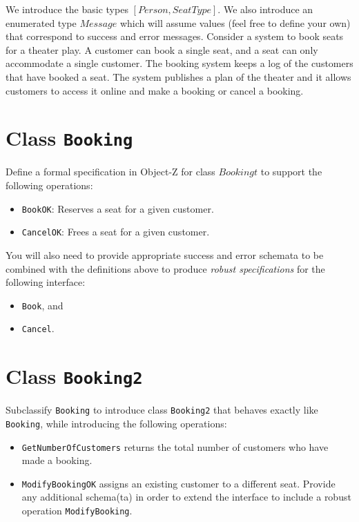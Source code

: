 \documentclass[12pt]{article}
\begin{document}
We introduce the basic types $[Person, SeatType]$. We also introduce an enumerated type $Message$ which will assume values (feel free to define your own) that correspond to success and error messages. Consider a system to book seats for a theater play. A customer can book a single seat, and a seat can only accommodate a single customer. The booking system keeps a log of the customers that have booked a seat. The system publishes a plan of the theater and it allows customers to access it online and make a booking or cancel a booking.\\

\section*{Class \texttt{Booking}}

Define a formal specification in Object-Z for class $Bookingt$ to  support the following operations:

\begin{itemize}

\item \texttt{BookOK}: Reserves a seat for a given customer.

\item \texttt{CancelOK}:  Frees a seat for a given customer.

\end{itemize}

\noindent You will also need to provide appropriate success and error schemata to be combined with the definitions above to produce \textit{robust specifications} for the following interface:

\begin{itemize}

\item \texttt{Book}, and

\item \texttt{Cancel}.

\end{itemize}

\section*{Class \texttt{Booking2}}

Subclassify \texttt{Booking} to introduce class \texttt{Booking2} that behaves exactly like \texttt{Booking}, while introducing the following operations:

\begin{itemize}

\item \texttt{GetNumberOfCustomers} returns the total number of customers who have made a booking.

\item \texttt{ModifyBookingOK} assigns an existing customer to a different seat. Provide any additional schema(ta) in order to extend the interface to include a robust operation \texttt{ModifyBooking}.

\end{itemize}
\end{document}
